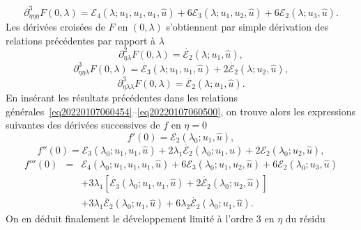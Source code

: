 \documentclass[12pt, final]{amsart}
\begin{document}
\begin{equation}
  \partial_{\eta  \eta  \eta}^3 F (0, \lambda) =\mathcal{E}_4
  (\lambda ; u_1, u_1, u_1, \hat{u}) + 6\mathcal{E}_3 (\lambda ; u_1, u_2,
  \hat{u}) + 6\mathcal{E}_2 (\lambda ; u_3, \hat{u}) .
\end{equation}
Les d{\'e}riv{\'e}es crois{\'e}es de $F$ en $(0, \lambda)$ s'obtiennent par
simple d{\'e}rivation des relations pr{\'e}c{\'e}dentes par rapport {\`a}
$\lambda$
\begin{equation}
  \partial_{\eta  \lambda}^2 F (0, \lambda) = \dot{\mathcal{E}_2}
  (\lambda ; u_1, \hat{u}),
\end{equation}
\begin{equation}
  \partial_{\eta  \eta  \lambda}^3 F (0, \lambda) =
  \dot{\mathcal{E}_3} (\lambda ; u_1, u_1, \hat{u}) + 2 \dot{\mathcal{E}_2}
  (\lambda ; u_2, \hat{u}),
\end{equation}
\begin{equation}
  \partial_{\eta  \lambda  \lambda}^3 F (0, \lambda) =
  \ddot{\mathcal{E}_2} (\lambda ; u_1, \hat{u}) .
\end{equation}
En ins{\'e}rant les r{\'e}sultats pr{\'e}c{\'e}dentes dans les relations
g{\'e}n{\'e}rales~\eqref{eq20220107060454}--\eqref{eq20220107060500}, on
trouve alors les expressions suivantes des d{\'e}riv{\'e}es successives de $f$
en $\eta = 0$
\begin{equation}
  f' (0) =\mathcal{E}_2 (\lambda_0 ; u_1, \hat{u}),
\end{equation}
\begin{equation}
  f'' (0) =\mathcal{E}_3 (\lambda_0 ; u_1, u_1, \hat{u}) + 2 \lambda_1
  \dot{\mathcal{E}_2} (\lambda_0 ; u_1, \hat{u}) + 2\mathcal{E}_2 (\lambda_0 ;
  u_2, \hat{u}),
\end{equation}
\begin{eqnarray}
  f''' (0) & = & \mathcal{E}_4 (\lambda_0 ; u_1, u_1, u_1, \hat{u}) +
  6\mathcal{E}_3 (\lambda_0 ; u_1, u_2, \hat{u}) + 6\mathcal{E}_2 (\lambda_0 ;
  u_3, \hat{u}) \nonumber\\
  &  &  + 3 \lambda_1  [\dot{\mathcal{E}_3} (\lambda_0 ; u_1, u_1,
  \hat{u}) + 2 \dot{\mathcal{E}_2} (\lambda_0 ; u_2, \hat{u})] \nonumber\\
  &  &  + 3 \lambda_1   \ddot{\mathcal{E}_2} (\lambda_0 ; u_1,
  \hat{u}) + 6 \lambda_2  \dot{\mathcal{E}_2} (\lambda_0 ; u_1, \hat{u}) .
\end{eqnarray}
On en d{\'e}duit finalement le d{\'e}veloppement limit{\'e} {\`a} l'ordre 3 en
$\eta$ du r{\'e}sidu
\end{document}
